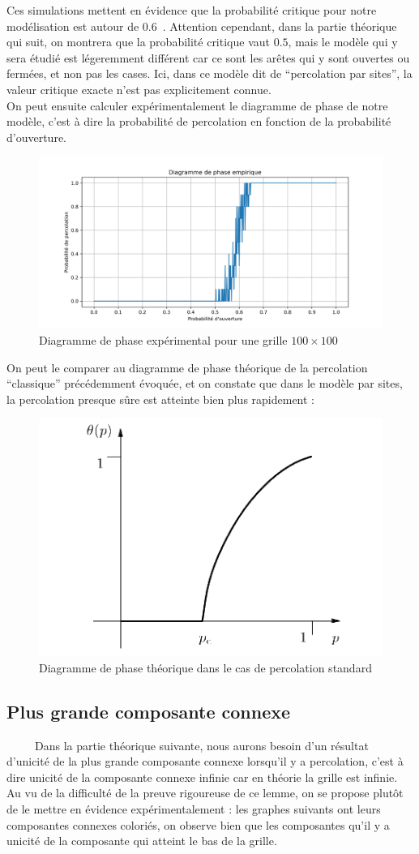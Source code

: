 \documentclass[11pt,a4paper]{article}
\begin{document}
Ces simulations mettent en évidence que la probabilité critique pour notre modélisation est autour de $0.6$\ . Attention cependant, dans la partie théorique qui suit, on montrera que la probabilité critique vaut $0.5$, mais le modèle qui y sera étudié est légeremment différent car ce sont les arêtes qui y sont ouvertes ou fermées, et non pas les cases. Ici, dans ce modèle dit de ``percolation par sites'', la valeur critique exacte n'est pas explicitement connue. \\

On peut ensuite calculer expérimentalement le diagramme de phase de notre modèle, c'est à dire la probabilité de percolation en fonction de la probabilité d'ouverture.
\begin{figure}[htbp]
    \centering
    \includegraphics[width=0.6 \textwidth]{./Pictures/percolation_probability.png}
    \caption{Diagramme de phase expérimental pour une grille $100\times 100$}
    \label{fig:evol}
\end{figure}

On peut le comparer au diagramme de phase théorique de la percolation ``classique'' précédemment évoquée, et on constate que dans le modèle par sites, la percolation presque sûre est atteinte bien plus rapidement : 

\begin{figure}[htbp]
    \centering
    \includegraphics[width=0.4 \textwidth]{./Pictures/ph_th.png}
    \caption{Diagramme de phase théorique dans le cas de percolation standard \cite{grimmett}}
    \label{fig:evol}
\end{figure}

\subsection{Plus grande composante connexe}
\ \ \ \ \ Dans la partie théorique suivante, nous aurons besoin d'un résultat d'unicité de la plus grande composante connexe lorsqu'il y a percolation, c'est à dire unicité de la composante connexe infinie car en théorie la grille est infinie. Au vu de la difficulté de la preuve rigoureuse de ce lemme, on se propose plutôt de le mettre en évidence expérimentalement : les graphes suivants ont leurs composantes connexes coloriés, on observe bien que les composantes qu'il y a unicité de la composante qui atteint le bas de la grille. 
\end{document}
